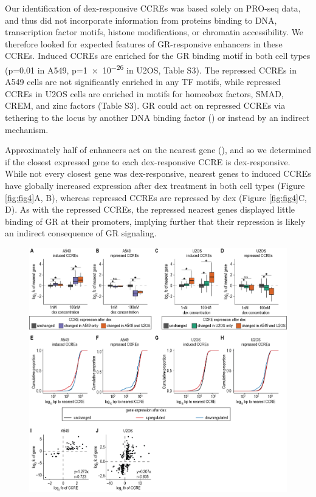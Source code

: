 \documentclass{article}
\begin{document}
{Our identification of dex-responsive CCREs was based solely on PRO-seq data, and thus did not incorporate information from proteins binding to DNA, transcription factor motifs, histone modifications, or chromatin accessibility. We therefore looked for expected features of GR-responsive enhancers in these CCREs. Induced CCREs are enriched for the GR binding motif in both cell types (p=0.01 in A549, p=\num{1e-26} in U2OS, Table S3). The repressed CCREs in A549 cells are not significantly enriched in any TF motifs, while repressed CCREs in U2OS cells are enriched in motifs for homeobox factors, SMAD, CREM, and zinc factors (Table S3). GR could act on repressed CCREs via tethering to the locus by another DNA binding factor (\cite{weikum_glucocorticoid_2017}) or instead by an indirect mechanism. 
\clearpage


Approximately half of enhancers act on the nearest gene (\cite{fulco_activity-by-contact_2019}), and so we determined if the closest expressed gene to each dex-responsive CCRE is dex-responsive.  While not every closest gene was dex-responsive, nearest genes to induced CCREs have globally increased expression after dex treatment in both cell types (Figure \ref{fig:fig4}A, B), whereas repressed CCREs are repressed by dex (Figure \ref{fig:fig4}C, D). As with the repressed CCREs, the repressed nearest genes displayed little binding of GR at their promoters, implying further that their repression is likely an indirect consequence of GR signaling. 
\begin{figure}[hb]
\includegraphics[width=\textwidth]{figures/Figure4_v2_2021-04.png}

\end{figure}}
\end{document}
